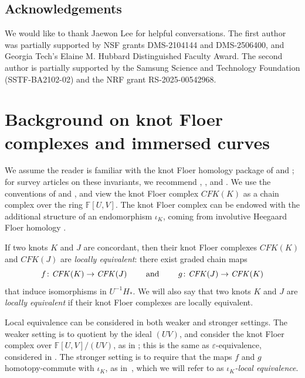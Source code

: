 \documentclass[11pt, reqno]{amsart}
\theoremstyle{definition}
\theoremstyle{remark}
\def\F{\mathbb{F}}
\def\CFK{\mathit{CFK}}
\numberwithin{equation}{section}
\begin{document}
\subsection*{Acknowledgements} 
We would like to thank Jaewon Lee for helpful conversations. The first author was partially supported by NSF grants DMS-2104144 and DMS-2506400, and Georgia Tech's Elaine M. Hubbard Distinguished Faculty Award.
The second author is partially supported by the Samsung Science and Technology Foundation (SSTF-BA2102-02) and the NRF grant RS-2025-00542968.








\section{Background on knot Floer complexes and immersed curves}\label{sec:background}

We assume the reader is familiar with the knot Floer homology package of \cite{OS-knots} and \cite{Rasmussen-thesis}; for survey articles on these invariants, we recommend \cite{OS-intro}, \cite{Hom-survey}, and \cite{Hom-lecture}. We use the conventions of \cite{Zemke-link} and \cite{DHST-conc}, and view the knot Floer complex $\CFK(K)$ as a chain complex over the ring $\F[U, V]$. The knot Floer complex can be endowed with the additional structure of an endomorphism $\iota_K$, coming from involutive Heegaard Floer homology \cite{HendricksManolescu}.

If two knots $K$ and $J$ are concordant, then their knot Floer complexes $\CFK(K)$ and $\CFK(J)$ are \emph{locally equivalent}: there exist graded chain maps
\[
f \colon \CFK(K) \to \CFK(J) \qquad \textup{ and } \qquad g \colon \CFK(J) \to \CFK(K)
\]
that induce isomorphisms in $U^{-1}H_*$.  
We will also say that two knots $K$ and $J$ are \emph{locally equivalent} if their knot Floer complexes are locally equivalent.


Local equivalence can be considered in both weaker and stronger settings. The weaker setting is to quotient by the ideal $(UV)$, and consider the knot Floer complex over $\F[U,V]/(UV)$, as in \cite[Definition 2.3]{DHST-conc}; this is the same as $\varepsilon$-equivalence, considered in \cite[Section 4.1]{Hom-CFKconc}. The stronger setting is to require that the maps $f$ and $g$ homotopy-commute with $\iota_K$, as in~\cite[Definition~2.4]{Zemke-connected}, which we will refer to as \emph{$\iota_K$-local equivalence}.
\end{document}
